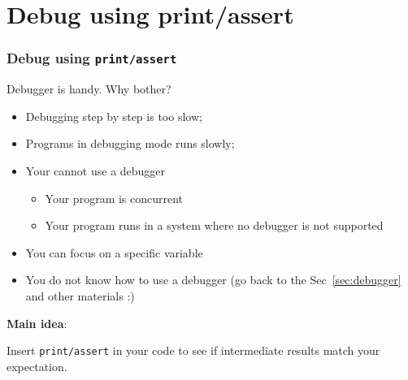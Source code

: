 \documentclass[aspectratio=169]{beamer}
\begin{document}
\section{Debug using print/assert}
\begin{frame}
\frametitle{Debug using \texttt{print/assert}}

Debugger is handy. Why bother?

\begin{itemize}
    \item Debugging step by step is too slow;
    \item Programs in debugging mode runs slowly;
    \item Your cannot use a debugger
    \begin{itemize}
        \item Your program is concurrent
        \item Your program runs in a system where no debugger is not supported
    \end{itemize}
    \item You can focus on a specific variable
    \item You do not know how to use a debugger (go back to the Sec~\ref{sec:debugger} and other materials :)
\end{itemize}

\end{frame}

\begin{frame}

\textbf{Main idea}:

Insert \texttt{print/assert} in your code to see if intermediate results match your expectation.

\end{frame}
\end{document}
